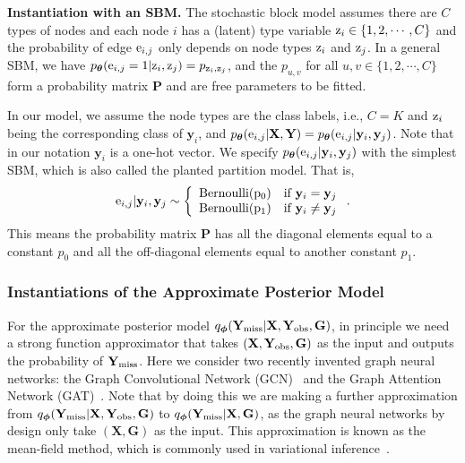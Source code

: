 \documentclass{article}
\newcommand{\vpara}[1]{\vspace{0.05in}\noindent\textbf{#1 }}
\def\re{{\textnormal{e}}}
\def\rz{{\textnormal{z}}}
\def\rvy{{\mathbf{y}}}
\def\rmG{{\mathbf{G}}}
\def\rmX{{\mathbf{X}}}
\def\rmY{{\mathbf{Y}}}
\def\vtheta{{\bm{\theta}}}
\def\mP{{\bm{P}}}
\newcommand{\rYmiss}{\rmY_{\rm{miss}}}
\newcommand{\rYobs}{\rmY_{\rm{obs}}}
\def\vphi{{\bm{\phi}}}
\begin{document}
\vpara{Instantiation with an SBM.} The stochastic block model assumes there are $C$ types of nodes and each node $i$ has a (latent) type variable $\rz_i \in \{1, 2, \cdots, C\}$ and the probability of edge $\re_{i,j}$ only depends on node types $\rz_i$ and $\rz_j$. In a general SBM, we have $p_{\vtheta}(\re_{i,j} = 1|\rz_i, \rz_j) = p_{\rz_i, \rz_j}$, and the $p_{u,v}$ for all $u, v \in \{1, 2, \cdots, C\}$ form a probability matrix $\mP$ and are free parameters to be fitted. 

In our model, we assume the node types are the class labels, i.e., $C=K$ and $\rz_i$ being the corresponding class of $\rvy_i$, and $p_{\vtheta}(\re_{i,j}|\rmX, \rmY) = p_{\vtheta}(\re_{i,j}|\rvy_i, \rvy_j)$. Note that in our notation $\rvy_i$ is a one-hot vector. We specify $p_{\vtheta}(\re_{i,j}|\rvy_i, \rvy_j)$ with the simplest SBM, which is also called the planted partition model. That is,
\begin{align*}
    \re_{i,j}|\rvy_i, \rvy_j \sim \left\{
    \begin{array}{cc}
         \rm{Bernoulli}(p_0) & \text{if  } \rvy_i=\rvy_j \\
         \rm{Bernoulli}(p_1) & \text{if  } \rvy_i\neq \rvy_j
    \end{array}
    \right..
\end{align*}
This means the probability matrix $\mP$ has all the diagonal elements equal to a constant $p_0$ and all the off-diagonal elements equal to another constant $p_1$.

\subsubsection{Instantiations of the Approximate Posterior Model}

For the approximate posterior model $q_{\vphi}(\rYmiss|\rmX,\rYobs, \rmG)$, in principle we need a strong function approximator that takes $(\rmX,\rYobs, \rmG)$ as the input and outputs the probability of $\rYmiss$. Here we consider two recently invented graph neural networks: the Graph Convolutional Network (GCN)~\cite{kipf2016semi} and the Graph Attention Network (GAT)~\cite{velivckovic2017graph}. Note that by doing this we are making a further approximation from $q_{\vphi}(\rYmiss|\rmX,\rYobs, \rmG)$ to $q_{\vphi}(\rYmiss|\rmX, \rmG)$, as the graph neural networks by design only take $(\rmX, \rmG)$ as the input. This approximation is known as the mean-field method, which is commonly used in variational inference~\cite{blei2017variational}. 
\end{document}
